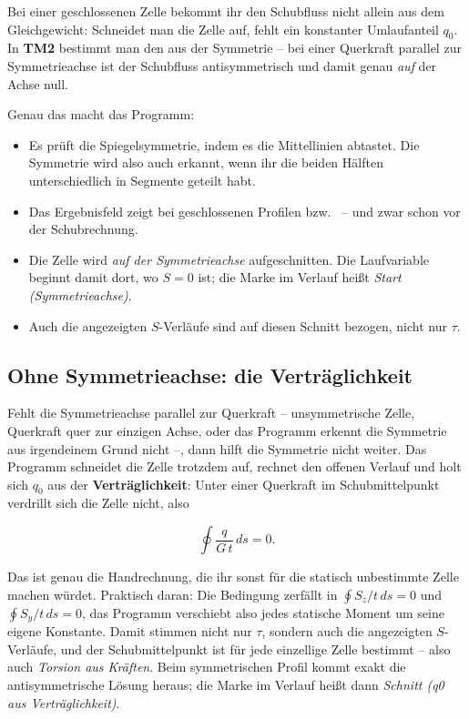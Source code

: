 Bei einer geschlossenen Zelle bekommt ihr den Schubfluss nicht allein aus dem Gleichgewicht:
Schneidet man die Zelle auf, fehlt ein konstanter Umlaufanteil $q_0$. In \textbf{TM2} bestimmt
man den aus der Symmetrie -- bei einer Querkraft parallel zur Symmetrieachse ist der Schubfluss
antisymmetrisch und damit genau \emph{auf} der Achse null.

Genau das macht das Programm:

\begin{itemize}
  \item Es prüft die Spiegelsymmetrie, indem es die Mittellinien abtastet. Die Symmetrie wird
        also auch erkannt, wenn ihr die beiden Hälften unterschiedlich in Segmente geteilt habt.
  \item Das Ergebnisfeld zeigt bei geschlossenen Profilen  bzw.\
         -- und zwar schon vor der Schubrechnung.
  \item Die Zelle wird \emph{auf der Symmetrieachse} aufgeschnitten. Die Laufvariable beginnt
        damit dort, wo $S = 0$ ist; die Marke im Verlauf heißt \emph{Start (Symmetrieachse)}.
  \item Auch die angezeigten $S$-Verläufe sind auf diesen Schnitt bezogen, nicht nur $\tau$.
\end{itemize}

\subsection{Ohne Symmetrieachse: die Verträglichkeit}

Fehlt die Symmetrieachse parallel zur Querkraft -- unsymmetrische Zelle, Querkraft quer zur
einzigen Achse, oder das Programm erkennt die Symmetrie aus irgendeinem Grund nicht --, dann hilft
die Symmetrie nicht weiter. Das Programm schneidet die Zelle trotzdem auf, rechnet den offenen
Verlauf und holt sich $q_0$ aus der \textbf{Verträglichkeit}: Unter einer Querkraft im
Schubmittelpunkt verdrillt sich die Zelle nicht, also

\[
  \oint \frac{q}{G\,t}\,ds = 0 .
\]

Das ist genau die Handrechnung, die ihr sonst für die statisch unbestimmte Zelle machen würdet.
Praktisch daran: Die Bedingung zerfällt in $\oint S_z/t\,ds = 0$ und $\oint S_y/t\,ds = 0$, das
Programm verschiebt also jedes statische Moment um seine eigene Konstante. Damit stimmen nicht nur
$\tau$, sondern auch die angezeigten $S$-Verläufe, und der Schubmittelpunkt ist für jede einzellige
Zelle bestimmt -- also auch \emph{Torsion aus Kräften}. Beim symmetrischen Profil kommt exakt die
antisymmetrische Lösung heraus; die Marke im Verlauf heißt dann \emph{Schnitt (q0 aus
Verträglichkeit)}.

